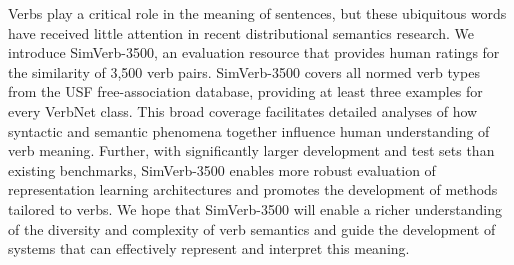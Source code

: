 Verbs play a critical role in the meaning of sentences, but these ubiquitous words have received little attention in recent distributional semantics research. We introduce SimVerb-3500, an evaluation resource that provides human ratings for the similarity of 3,500 verb pairs.  SimVerb-3500 covers all normed verb types from the USF free-association database, providing at least three examples for every VerbNet class. This broad coverage facilitates detailed analyses of how syntactic and semantic phenomena together influence human understanding of verb meaning. Further, with significantly larger development and test sets than existing benchmarks, SimVerb-3500 enables more robust evaluation of representation learning architectures and promotes the development of methods tailored to verbs. We hope that SimVerb-3500 will enable a richer understanding of the diversity and complexity of verb semantics and guide the development of systems that can effectively represent and interpret this meaning.
